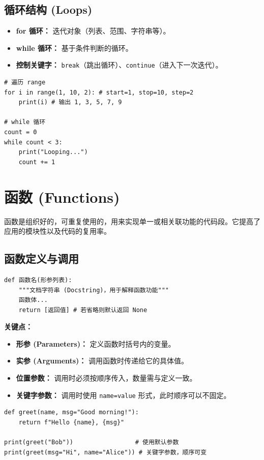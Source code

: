 \documentclass{article}
\begin{document}
\subsection{循环结构 (Loops)}
\begin{itemize}
    \item \textbf{for 循环：} 迭代对象（列表、范围、字符串等）。
    \item \textbf{while 循环：} 基于条件判断的循环。
    \item \textbf{控制关键字：} \texttt{break}（跳出循环）、\texttt{continue}（进入下一次迭代）。
\end{itemize}
\begin{lstlisting}
# 遍历 range
for i in range(1, 10, 2): # start=1, stop=10, step=2
    print(i) # 输出 1, 3, 5, 7, 9

# while 循环
count = 0
while count < 3:
    print("Looping...")
    count += 1
\end{lstlisting}

\section{函数 (Functions)}

函数是组织好的，可重复使用的，用来实现单一或相关联功能的代码段。它提高了应用的模块性以及代码的复用率。

\subsection{函数定义与调用}
\begin{lstlisting}
def 函数名(形参列表):
    """文档字符串 (Docstring)，用于解释函数功能"""
    函数体...
    return [返回值] # 若省略则默认返回 None
\end{lstlisting}

\textbf{关键点：}
\begin{itemize}
    \item \textbf{形参 (Parameters)：} 定义函数时括号内的变量。
    \item \textbf{实参 (Arguments)：} 调用函数时传递给它的具体值。
    \item \textbf{位置参数：} 调用时必须按顺序传入，数量需与定义一致。
    \item \textbf{关键字参数：} 调用时使用 \texttt{name=value} 形式，此时顺序可以不固定。
\end{itemize}

\begin{lstlisting}
def greet(name, msg="Good morning!"):
    return f"Hello {name}, {msg}"

print(greet("Bob"))                 # 使用默认参数
print(greet(msg="Hi", name="Alice")) # 关键字参数，顺序可变
\end{lstlisting}
\end{document}
